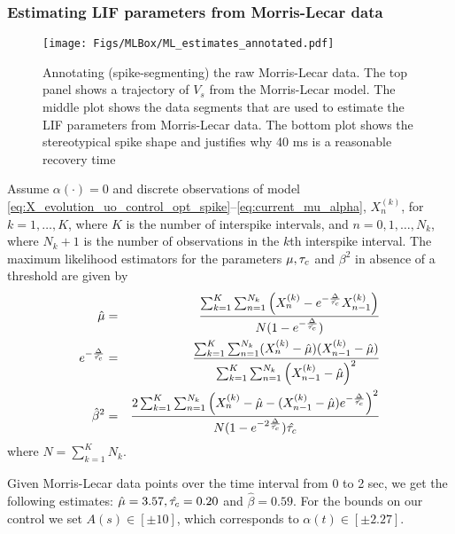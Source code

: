 \subsubsection{Estimating LIF parameters from Morris-Lecar data }
\label{sec:estimaing_LIF_from_ML}


\begin{figure}
\begin{center}
  \texttt{[image: Figs/MLBox/ML\_estimates\_annotated.pdf]} 
  \caption[Spike-annotation for Morrir-Lecar model trajectory]{Annotating
  (spike-segmenting) the raw Morris-Lecar data. The top panel shows a trajectory of $V_s$ from the Morris-Lecar model. 
  The middle plot shows the data segments that are used to estimate the LIF
  parameters from Morris-Lecar data. 
  The bottom plot shows the stereotypical spike shape and justifies why 40 ms
  is a reasonable recovery time}
  \label{fig:ML_estimates_data} 
\end{center}
\end{figure} 
Assume $\alpha(\cdot)=0$ and discrete observations of model \eqref{eq:X_evolution_uo_control_opt_spike}--\eqref{eq:current_mu_alpha}, $X_n^{(k)}$, for $k=1,\ldots ,
K$, where $K$ is the number of interspike intervals, and $n=0,1, \ldots
, N_k$, where $N_k+1$ is the number of observations in the $k$th
interspike interval. 
The maximum likelihood estimators for the parameters $\mu, \tau_c$ and
$\beta^2$ in absence of a threshold are given by 
\begin{eqnarray*} 
\hat{ \mu} &=& 
\frac{ \sum_{k=1}^K \sum_{n=1}^{N_k} \left( X^{(k)}_n - e^{-\frac{\Delta} {\hat {\tau_c}}} X^{(k)}_{n-1} \right)} 
	 { N( 1-e^{-\frac {\Delta} {\hat {\tau_c}}})}
\\
e^{-\frac {\Delta}{\hat{\tau_c}} } &=& 
\frac { \sum_{k=1}^K \sum_{n=1}^{N_k} ( X^{(k)}_n - \hat \mu)(X^{(k)}_{n-1} - \hat \mu) }
						  { \sum_{k=1}^K \sum_{n=1}^{N_k} \left( X^{(k)}_{n-1} - \hat \mu \right)^2 } 
\\
\hat\beta^2 &=&  
\frac{ 2\sum_{k=1}^K \sum_{n=1}^{N_k}  \left( X^{(k)}_n - \hat \mu - (X^{(k)}_{n-1} -
\hat \mu) e^{-\frac {\Delta} {\hat {\tau_c}}} \right)^2 } 
	  { N (1-e^{-2\frac {\Delta} {\hat {\tau_c}}}) \hat {\tau_c}}
\end{eqnarray*}
where $N= \sum_{k=1}^K N_k$.

Given Morris-Lecar data points over the time interval from 0 to 2 sec, we get
the following estimates: $\hat \mu = 3.57, \hat {\tau_c} = 0.20$ and $\hat \beta = 0.59$. For the bounds on our 
control we set $A(s) \in [\pm 10]$, which corresponds to $\alpha(t)
\in [\pm 2.27]$.

